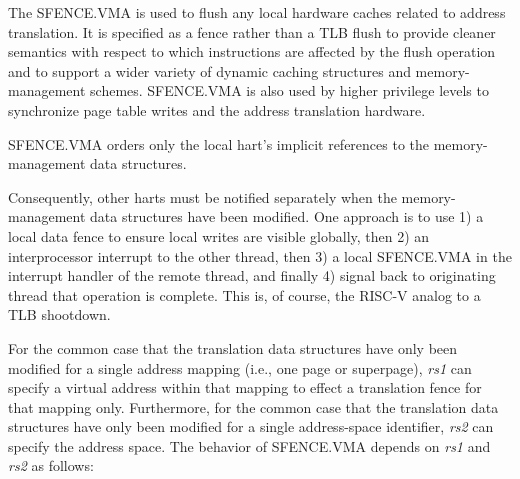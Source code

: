 \begin{commentary}
The SFENCE.VMA is used to flush any local hardware caches related to
address translation.  It is specified as a fence rather than a TLB
flush to provide cleaner semantics with respect to which instructions
are affected by the flush operation and to support a wider variety of
dynamic caching structures and memory-management schemes.  SFENCE.VMA
is also used by higher privilege levels to synchronize page table
writes and the address translation hardware.
\end{commentary}

SFENCE.VMA orders only the local hart's implicit references to the
memory-management data structures.

\begin{commentary}
Consequently, other harts must be notified separately when the
memory-management data structures have been modified.
One approach is to use 1)
a local data fence to ensure local writes are visible globally, then
2) an interprocessor interrupt to the other thread, then 3) a local
SFENCE.VMA in the interrupt handler of the remote thread, and finally
4) signal back to originating thread that operation is complete.  This
is, of course, the RISC-V analog to a TLB shootdown.
\end{commentary}

For the common case that the translation data structures have only been
modified for a single address mapping (i.e., one page or superpage), {\em rs1}
can specify a virtual address within that mapping to effect a translation
fence for that mapping only.  Furthermore, for the common case that the
translation data structures have only been modified for a single address-space
identifier, {\em rs2} can specify the address space.  The behavior of
SFENCE.VMA depends on {\em rs1} and {\em rs2} as follows:

